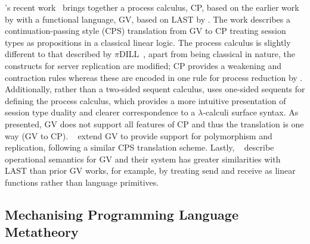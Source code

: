 \documentclass{mprop}
\newcommand{\1}{\textbf{1}\xspace}
\begin{document}
\citeauthor{Wadler:2012}'s recent work~\cite{Wadler:2012} brings together a
process calculus, CP, based on the earlier work by
\citeauthor{Caires:2010:STI} with a functional language, GV, based on LAST by
\citeauthor{Gay:2010:LAST}. The work describes a continuation-passing style
(CPS) translation from GV to CP treating session types as propositions in a
classical linear logic. The process calculus is slightly different to that
described by $\pi$DILL~\cite{Caires:2010:STI}, apart from being classical in
nature, the constructs for server replication are modified; CP provides a
weakening and contraction rules whereas these are encoded in one rule for
process reduction by \citeauthor{Caires:2010:STI}. Additionally, rather than a
two-sided sequent calculus, \citeauthor{Wadler:2012} uses one-sided sequents
for defining the process calculus, which provides a more intuitive
presentation of session type duality and clearer correspondence to a
$\lambda$-calculi surface syntax. As presented, GV does not support all
features of CP and thus the translation is one way (GV to
CP). \citeauthor{Lindley:2014:SAP}~\cite{Lindley:2014:SAP} extend GV to
provide support for polymorphism and replication, following a similar CPS
translation scheme. Lastly,
\citeauthor{Lindley:2014:SPS}~\cite{Lindley:2014:SPS} describe operational
semantics for GV and their system has greater similarities with LAST than
prior GV works, for example, by treating send and receive as linear functions
rather than language primitives.


\subsection{Mechanising Programming Language Metatheory}
\end{document}
